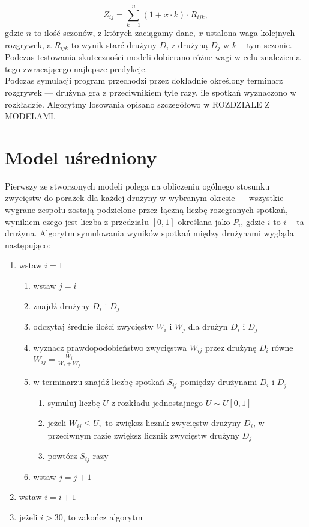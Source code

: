 \documentclass[inzynierska]{pwr_wmat_praca_dyplomowa}
\theoremstyle{plain}
\numberwithin{theorem}{chapter}
\theoremstyle{definition}
\numberwithin{theorem}{chapter}
\begin{document}
\begin{equation}
	Z_{ij} = \sum_{k=1}^{n} (1+x\cdot k)\cdot R_{ijk}, 
\end{equation}
gdzie $n$ to ilość sezonów, z których zaciągamy dane, $x$ ustalona waga kolejnych rozgrywek, a $R_{ijk}$ to wynik starć drużyny $D_i$ z drużyną $D_j$ w $k-$tym sezonie. Podczas testowania skuteczności modeli dobierano różne wagi w celu znalezienia tego zwracającego najlepsze predykcje.    
\\
Podczas symulacji program przechodzi przez dokładnie określony terminarz rozgrywek --- drużyna gra z przeciwnikiem tyle razy, ile spotkań wyznaczono w rozkładzie. Algorytmy losowania opisano szczegółowo w ROZDZIALE Z MODELAMI.
\\


\section{Model uśredniony}
Pierwszy ze stworzonych modeli polega na obliczeniu ogólnego stosunku zwycięstw do porażek dla każdej drużyny w wybranym okresie --- wszystkie wygrane zespołu zostają podzielone przez łączną liczbę rozegranych spotkań, wynikiem czego jest liczba z przedziału $[0,1]$ określana jako $P_{i}$, gdzie $i$ to $i-$ta drużyna. Algorytm symulowania wyników spotkań między drużynami wygląda następująco:
\begin{enumerate}
	\item wstaw $i=1$
	\begin{enumerate}
		\item wstaw $j=i$
		\item znajdź drużyny $D_i$ i $D_j$
		\item odczytaj średnie ilości zwycięstw $W_i$ i $W_j$ dla drużyn $D_i$ i $D_j$ 
		\item wyznacz prawdopodobieństwo zwycięstwa $W_{ij}$ przez drużynę  $D_i$ równe $W_{ij}=\frac{W_i}{W_i + W_j}$   
		\item w terminarzu znajdź liczbę spotkań $S_{ij}$ pomiędzy drużynami $D_i$ i $D_j$
			\begin{enumerate}
				\item symuluj liczbę $U$ z rozkładu jednostajnego $U\sim U[0,1]$ 
			\item jeżeli $W_{ij} \leq U,$ to zwiększ licznik zwycięstw drużyny $D_i$, w przeciwnym razie zwiększ licznik zwycięstw drużyny $D_j$
			\item powtórz $S_{ij}$ razy
			\end{enumerate}
		\item wstaw $j=j+1$
	\end{enumerate}
	\item wstaw $i=i+1$
	\item jeżeli $i> 30$, to zakończ algorytm
\end{enumerate} 
\end{document}
